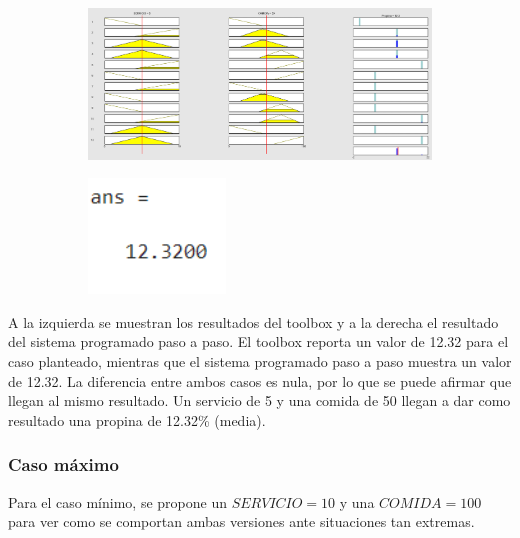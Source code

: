 \documentclass[11pt, letterpaper]{article}
\begin{document}
\begin{figure}[h]
	\centering
	\begin{subfigure}{0.40\textwidth} %
		\centering
		\includegraphics[width=1.4\textwidth]{IMG/RP12.png}
		\label{fig:G5}
	\end{subfigure}
	\hfill
	\begin{subfigure}{0.42\textwidth} %
		\centering
		\includegraphics[width=0.4\textwidth]{IMG/M12.png}
		\label{fig:G6}
	\end{subfigure}
	\label{fig:comparacion3}
\end{figure}

A la izquierda se muestran los resultados del toolbox y a la derecha el resultado del sistema programado paso a paso. El toolbox reporta un valor de 12.32 para el caso planteado, mientras que el sistema programado paso a paso muestra un valor de 12.32. La diferencia entre ambos casos es nula, por lo que se puede afirmar que llegan al mismo resultado. Un servicio de 5 y una comida de 50 llegan a dar como resultado una propina de 12.32\% (media).

\newpage

\subsubsection{Caso máximo}
Para el caso mínimo, se propone un $SERVICIO = 10$ y una $COMIDA = 100$ para ver como se comportan ambas versiones ante situaciones tan extremas.
\end{document}
